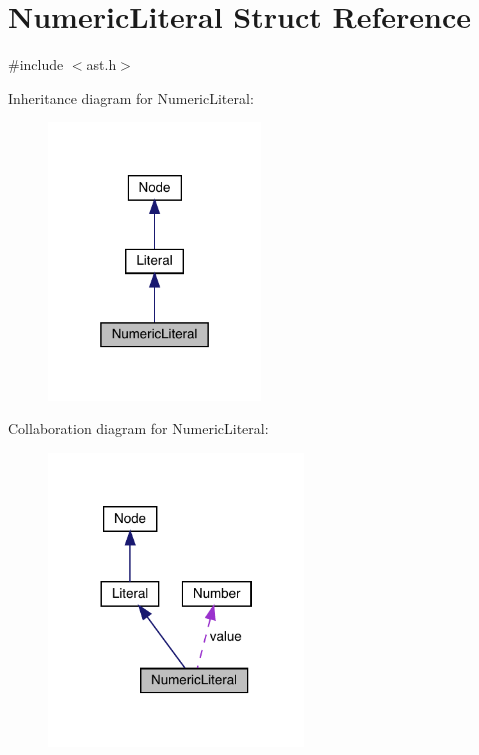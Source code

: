 \hypertarget{struct_numeric_literal}{}\section{Numeric\+Literal Struct Reference}
\label{struct_numeric_literal}


{\ttfamily \#include $<$ast.\+h$>$}



Inheritance diagram for Numeric\+Literal\+:\nopagebreak
\begin{figure}[H]
\begin{center}
\leavevmode
\includegraphics[width=160pt]{struct_numeric_literal__inherit__graph}
\end{center}
\end{figure}


Collaboration diagram for Numeric\+Literal\+:
\nopagebreak
\begin{figure}[H]
\begin{center}
\leavevmode
\includegraphics[width=192pt]{struct_numeric_literal__coll__graph}
\end{center}
\end{figure}
